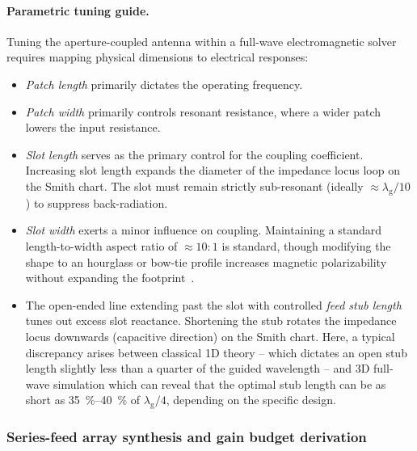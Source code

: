\paragraph{Parametric tuning guide.}
Tuning the aperture-coupled antenna within a full-wave electromagnetic solver requires mapping physical dimensions to electrical responses:
\begin{itemize}
    \item \textit{Patch length} primarily dictates the operating frequency.
    \item \textit{Patch width} primarily controls resonant resistance, where a wider patch lowers the input resistance.
    \item \textit{Slot length} serves as the primary control for the coupling coefficient.
    Increasing slot length expands the diameter of the impedance locus loop on the Smith chart.
    The slot must remain strictly sub-resonant (ideally $\approx \lambda_{\mathrm{g}}/10$) to suppress back-radiation.
    \item \textit{Slot width} exerts a minor influence on coupling.
    Maintaining a standard length-to-width aspect ratio of $\approx 10:1$ is standard, though modifying the shape to an hourglass or bow-tie profile increases magnetic polarizability without expanding the footprint~\parencite{priyalathaCompactModifiedHourglassshaped2023}.
    \item The open-ended line extending past the slot with controlled \textit{feed stub length} tunes out excess slot reactance.
    Shortening the stub rotates the impedance locus downwards (capacitive direction) on the Smith chart.
    Here, a typical discrepancy arises between classical 1D theory -- which dictates an open stub length slightly less than a quarter of the guided wavelength -- and 3D full-wave simulation which can reveal that the optimal stub length can be as short as \qtyrange{35}{40}{\percent} of $\lambda_{\mathrm{g}}/4$, depending on the specific design.
\end{itemize}

\subsubsection{Series-feed array synthesis and gain budget derivation}
\label{sec:series-feed-synthesis}


